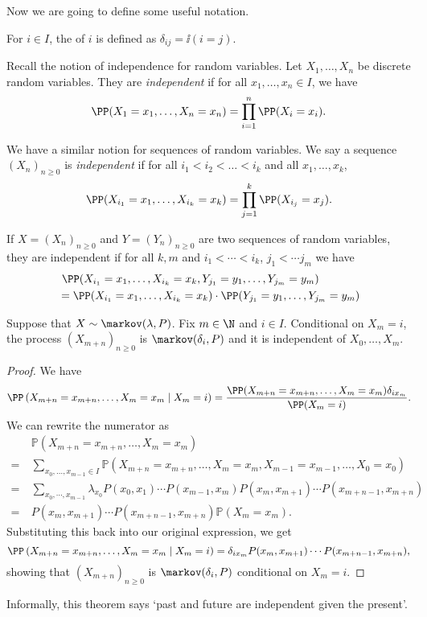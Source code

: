 \documentclass[a4paper]{scrartcl}
\begin{document}
Now we are going to define some useful notation.

\begin{definition}
	For $i \in I$, the  of $i$ is defined as
	$\delta_{ij} = \ii(i = j)$.
\end{definition}

Recall the notion of independence for random variables. Let $X_1, \dots, X_n$ be discrete random variables. They are \emph{independent} if for all $x_1, \dots, x_n \in I$, we have
$$
\PP(X_1= x_1, \dots, X_n = x_n) = \prod_{i = 1}^n \PP(X_i = x_i).
$$

We have a similar notion for sequences of random variables. We say a sequence $(X_n)_{n \geq 0}$ is \emph{independent} if for all $i_1 < i_2 < \dots < i_k$ and all $x_1, \dots, x_k$,
$$
\PP(X_{i_1} = x_1, \dots, X_{i_k} = x_k) = \prod_{j = 1}^k \PP(X_{i_j} = x_j).
$$

If $X = (X_n)_{n \geq 0}$ and $Y = (Y_n)_{n \geq 0}$ are two sequences of random variables, they are independent if for all $k, m$ and $i_1 < \cdots < i_k$, $j_1 < \cdots j_m$ we have
\begin{align*}
	&\ \PP(X_{i_1} = x_1, \dots, X_{i_k} = x_k, Y_{j_1} = y_1, \dots, Y_{j_m} = y_m) \\
	&= \PP(X_{i_1} = x_1, \dots, X_{i_k} = x_k) \cdot \PP(Y_{j_1} = y_1, \dots, Y_{j_m} = y_m) 
\end{align*}

\begin{theorem}
	Suppose that $X \sim \markov(\lambda, P)$. Fix $m \in \N$ and $i \in I$. Conditional on $X_m = i$, the process $(X_{m + n})_{n \geq 0}$ is $\markov(\delta_i, P)$ and it is independent of $X_0, \dots, X_m$.
\end{theorem}

\begin{proof}
	We have
	$$
		\PP\left(X_{m+n}=x_{m+n}, \ldots, X_{m}= x_{m} \mid X_{m}=i\right) = \frac{\PP(X_{m + n} = x_{m + n}, \dots, X_{m} = x_m) \delta_{i x_m}}{\PP(X_m = i)}.
		$$
	We can rewrite the numerator as
	\begin{align*}
	&\mathbb{P}\left(X_{m+n}=x_{m+n}, \ldots, X_{m}=x_{m}\right) \\
=\  &\sum_{x_{0}, \ldots, x_{m-1} \in I} \mathbb{P}\left(X_{m+n}=x_{m+n}, \ldots, X_{m}=x_{m}, X_{m-1}=x_{m-1}, \ldots, X_{0} =x_{0}\right) \\
=\ &\sum_{x_{0}, \cdots, x_{m-1}} \lambda_{x_{0}} P\left(x_{0}, x_{1}\right) \cdots P(x_{m-1}, x_{m}) P(x_{m}, x_{m+1}) \cdots P(x_{m+n-1}, x_{m+n})
 \\
=\ &P\left(x_{m}, x_{m+1}\right) \cdots P\left(x_{m+n-1}, x_{m+n}\right) \mathbb{P}\left(X_{m}=x_{m}\right).
	\end{align*}
	Substituting this back into our original expression, we get 
	$$
	\PP\left(X_{m+n}=x_{m+n}, \ldots, X_{m}= x_{m} \mid X_{m}=i\right) = \delta_{i x_m} P(x_m, x_{m + 1}) \cdots P(x_{m + n - 1}, x_{m + n}),
	$$
	showing that $(X_{m + n})_{n \geq 0}$ is $\markov(\delta_i, P)$ conditional on $X_m = i$.
\end{proof}

\begin{remark}
	Informally, this theorem says `past and future are independent given the present'.
\end{remark}
\end{document}
